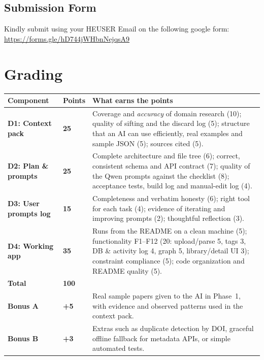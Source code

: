 \documentclass[11pt,a4paper]{article}
\begin{document}
\subsection{Submission Form}
Kindly submit using your HEUSER Email on the following google form: \url{https://forms.gle/hD744jWHbnNejqsA9}

\newpage

\section{Grading}
\begin{tabularx}{\textwidth}{@{}p{4.1cm}>{\centering\arraybackslash}p{1.3cm}L@{}}
\toprule
\textbf{Component} & \textbf{Points} & \textbf{What earns the points}\\
\midrule
\textbf{D1: Context pack} & \textbf{25} & Coverage and \emph{accuracy} of domain research (10); quality of sifting and the discard log (5); structure that an AI can use efficiently, real examples and sample JSON (5); sources cited (5).\\
\textbf{D2: Plan \& prompts} & \textbf{25} & Complete architecture and file tree (6); correct, consistent schema and API contract (7); quality of the Qwen prompts against the checklist (8); acceptance tests, build log and manual-edit log (4).\\
\textbf{D3: User prompts log} & \textbf{15} & Completeness and verbatim honesty (6); right tool for each task (4); evidence of iterating and improving prompts (2); thoughtful reflection (3).\\
\textbf{D4: Working app} & \textbf{35} & Runs from the README on a clean machine (5); functionality F1--F12 (20: upload/parse 5, tags 3, DB \& activity log 4, graph 5, library/detail UI 3); constraint compliance (5); code organization and README quality (5).\\
\midrule
\textbf{Total} & \textbf{100} & \\
\midrule
\textbf{Bonus A} & \textbf{+5} & Real sample papers given to the AI in Phase~1, with evidence and observed patterns used in the context pack.\\
\textbf{Bonus B} & \textbf{+3} & Extras such as duplicate detection by DOI, graceful offline fallback for metadata APIs, or simple automated tests.\\
\bottomrule
\end{tabularx}
\end{document}
